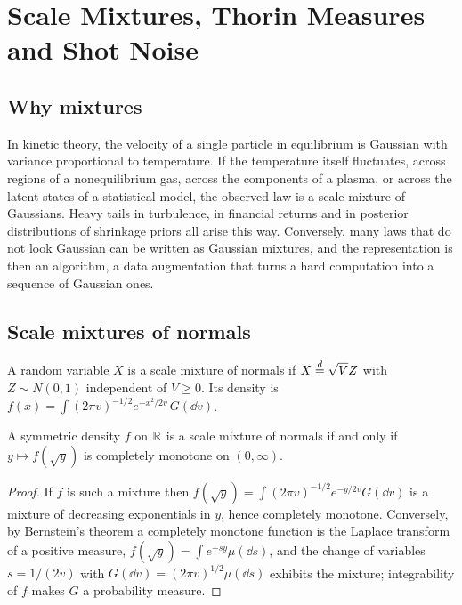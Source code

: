 \chapter{Scale Mixtures, Thorin Measures and Shot Noise}
\label{ch:mixtures}

\section{Why mixtures}

In kinetic theory, the velocity of a single particle in equilibrium is Gaussian with variance proportional to temperature. If the temperature itself fluctuates, across regions of a nonequilibrium gas, across the components of a plasma, or across the latent states of a statistical model, the observed law is a scale mixture of Gaussians. Heavy tails in turbulence, in financial returns and in posterior distributions of shrinkage priors all arise this way. Conversely, many laws that do not look Gaussian can be written as Gaussian mixtures, and the representation is then an algorithm, a data augmentation that turns a hard computation into a sequence of Gaussian ones.

\section{Scale mixtures of normals}

A random variable $X$ is a scale mixture of normals if $X\stackrel{d}{=}\sqrt{V}Z$ with $Z\sim N(0,1)$ independent of $V\geq0$. Its density is $f(x) = \int(2\pi v)^{-1/2}e^{-x^2/2v}\,G(\dd v)$.

\begin{theorem}
A symmetric density $f$ on $\mathbb{R}$ is a scale mixture of normals if and only if $y\mapsto f(\sqrt{y})$ is completely monotone on $(0,\infty)$.
\end{theorem}

\begin{proof}
If $f$ is such a mixture then $f(\sqrt y) = \int(2\pi v)^{-1/2}e^{-y/2v}G(\dd v)$ is a mixture of decreasing exponentials in $y$, hence completely monotone. Conversely, by Bernstein's theorem a completely monotone function is the Laplace transform of a positive measure, $f(\sqrt y) = \int e^{-sy}\mu(\dd s)$, and the change of variables $s = 1/(2v)$ with $G(\dd v) = (2\pi v)^{1/2}\mu(\dd s)$ exhibits the mixture; integrability of $f$ makes $G$ a probability measure.
\end{proof}

